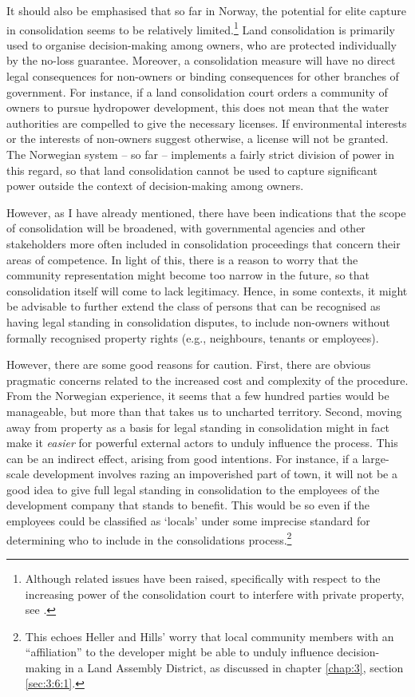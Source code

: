 It should also be emphasised that so far in Norway, the potential for elite capture in consolidation seems to be relatively limited.\footnote{Although related issues have been raised, specifically with respect to the increasing power of the consolidation court to interfere with private property, see \cite{stenseth07}.} Land consolidation is primarily used to organise decision-making among owners, who are protected individually by the no-loss guarantee. Moreover, a consolidation measure will have no direct legal consequences for non-owners or binding consequences for other branches of government. For instance, if a land consolidation court orders a community of owners to pursue hydropower development, this does not mean that the water authorities are compelled to give the necessary licenses. If environmental interests or the interests of non-owners suggest otherwise, a license will not be granted. The Norwegian system -- so far -- implements a fairly strict division of power in this regard, so that land consolidation cannot be used to capture significant power outside the context of decision-making among owners.

However, as I have already mentioned, there have been indications that the scope of consolidation will be broadened, with governmental agencies and other stakeholders more often included in consolidation proceedings that concern their areas of competence. In light of this, there is a reason to worry that the community representation might become too narrow in the future, so that consolidation itself will come to lack legitimacy. Hence, in some contexts, it might be advisable to further extend the class of persons that can be recognised as having legal standing in consolidation disputes, to include non-owners without formally recognised property rights (e.g., neighbours, tenants or employees). 

However, there are some good reasons for caution. First, there are obvious pragmatic concerns related to the increased cost and complexity of the procedure. From the Norwegian experience, it seems that a few hundred parties would be manageable, but more than that takes us to uncharted territory. Second, moving away from property as a basis for legal standing in consolidation might in fact make it {\it easier} for powerful external actors to unduly influence the process. This can be an indirect effect, arising from good intentions. For instance, if a large-scale development involves razing an impoverished part of town, it will not be a good idea to give full legal standing in consolidation to the employees of the development company that stands to benefit. This would be so even if the employees could be classified as `locals' under some imprecise standard for determining who to include in the consolidations process.\footnote{This echoes Heller and Hills' worry that local community members with an ``affiliation'' to the developer might be able to unduly influence decision-making in a Land Assembly District, as discussed in chapter \ref{chap:3}, section \ref{sec:3:6:1}.}

